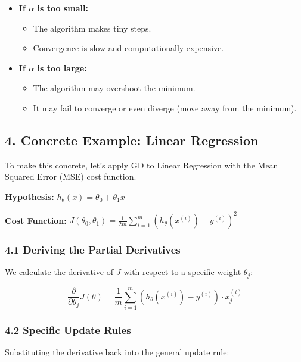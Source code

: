 \documentclass[
  italian,
  11pt,
]{article}
\begin{document}
\begin{itemize}
\item
  \textbf{If \(\alpha\) is too small:}

  \begin{itemize}
  \item
    The algorithm makes tiny steps.
  \item
    Convergence is slow and computationally expensive.
  \end{itemize}
\item
  \textbf{If \(\alpha\) is too large:}

  \begin{itemize}
  \item
    The algorithm may overshoot the minimum.
  \item
    It may fail to converge or even diverge (move away from the
    minimum).
  \end{itemize}
\end{itemize}

\subsection{4. Concrete Example: Linear
Regression}\label{concrete-example-linear-regression}

To make this concrete, let's apply GD to Linear Regression with the Mean
Squared Error (MSE) cost function.

\textbf{Hypothesis:} \(h_\theta(x) = \theta_0 + \theta_1 x\)

\textbf{Cost Function:}
\(J(\theta_0, \theta_1) = \frac{1}{2m} \sum_{i=1}^{m} (h_\theta(x^{(i)}) - y^{(i)})^2\)

\subsubsection{4.1 Deriving the Partial
Derivatives}\label{deriving-the-partial-derivatives}

We calculate the derivative of \(J\) with respect to a specific weight
\(\theta_j\):

\[\frac{\partial}{\partial \theta_j} J(\theta) = \frac{1}{m} \sum_{i=1}^{m} (h_\theta(x^{(i)}) - y^{(i)}) \cdot x_j^{(i)}\]

\subsubsection{4.2 Specific Update Rules}\label{specific-update-rules}

Substituting the derivative back into the general update rule:
\end{document}
